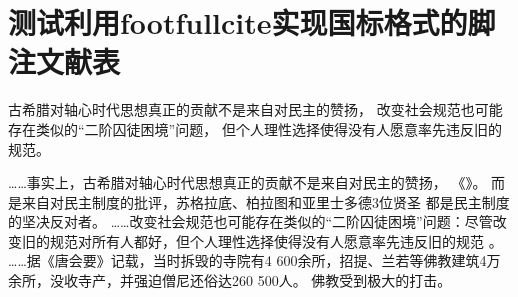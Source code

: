\documentclass{article}
\begin{document}
\section{测试利用footfullcite实现国标格式的脚注文献表}
\begin{refsection}

古希腊对轴心时代思想真正的贡献不是来自对民主的赞扬，
改变社会规范也可能存在类似的“二阶囚徒困境”问题，
但个人理性选择使得没有人愿意率先违反旧的规范。


\printbibliography[heading=subbibliography]
\end{refsection}

\newpage

\begin{refsection}
……事实上，古希腊对轴心时代思想真正的贡献不是来自对民主的赞扬，
《》。
而是来自对民主制度的批评，苏格拉底、柏拉图和亚里士多德3位贤圣
都是民主制度的坚决反对者。
……改变社会规范也可能存在类似的“二阶囚徒困境”问题：尽管改变旧的规范对所有人都好，但个人理性选择使得没有人愿意率先违反旧的规范
。
……据《唐会要》记载，当时拆毁的寺院有4 600余所，招提、兰若等佛教建筑4万余所，没收寺产，并强迫僧尼还俗达260 500人。
佛教受到极大的打击。
\end{refsection}
\end{document}
